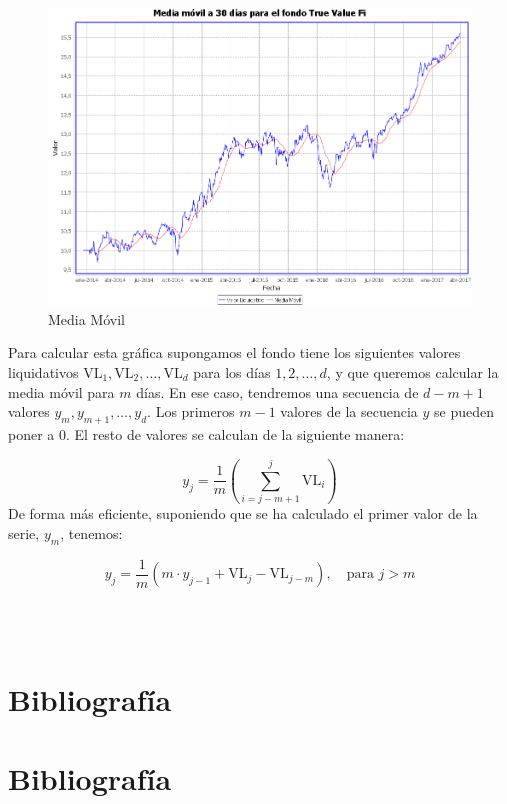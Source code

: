 \documentclass[12pt, a4paper]{article}
\newcommand*\parttitle{}
\let\origpart\part
\renewcommand*{\part}[2][]{%
	\ifx\\#1\\%
	\origpart{#2}%
	\renewcommand*\parttitle{#2}%
	\else
	\origpart[#1]{#2}%
	\renewcommand*\parttitle{#1}%
	\fi
}
\begin{document}
	\begin{figure}[htbp]
	\centering
	\includegraphics[width=\textwidth]{figuras/media.PNG}
	\caption{Media Móvil}
	\label{fig:media}
	\end {figure}
	
	Para calcular esta gráfica supongamos el fondo tiene los siguientes valores liquidativos $\text{VL}_1,\text{VL}_2,\ldots,\text{VL}_d$ para los días $1,2,\ldots,d$, y que queremos calcular la media móvil para $m$ días. En ese caso, tendremos una secuencia de $d-m+1$ valores $y_m,y_{m+1},\ldots,y_d$. Los primeros $m-1$ valores de la secuencia $y$ se pueden poner a $0$. El resto de valores se calculan de la siguiente manera:
	
	\begin{equation}
	y_j=\frac{1}{m}\left(\sum_{i=j-m+1}^{j}\text{VL}_i\right)
	\end{equation}
	De forma más eficiente, suponiendo que se ha calculado el primer valor de la serie, $y_m$, tenemos:
	
	\begin{equation}
	y_{j}=\frac{1}{m}\left(m\cdot y_{j-1}+\text{VL}_j-\text{VL}_{j-m}\right),\quad\text{para }j>m
	\end{equation}

\newpage

\newpage
\part{Bibliografía}
\end{document}
